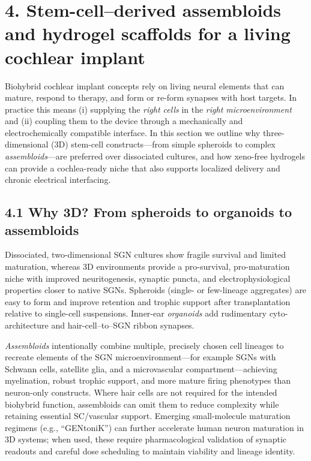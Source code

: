 \section*{4. Stem-cell–derived assembloids and hydrogel scaffolds for a living cochlear implant}

\noindent
Biohybrid cochlear implant concepts rely on living neural elements that can mature, respond to therapy, and form or re-form synapses with host targets. In practice this means (i) supplying the \emph{right cells} in the \emph{right microenvironment} and (ii) coupling them to the device through a mechanically and electrochemically compatible interface. In this section we outline why three-dimensional (3D) stem-cell constructs---from simple spheroids to complex \emph{assembloids}---are preferred over dissociated cultures, and how xeno-free hydrogels can provide a cochlea-ready niche that also supports localized delivery and chronic electrical interfacing.

\subsection*{4.1 Why 3D? From spheroids to organoids to assembloids}
Dissociated, two-dimensional SGN cultures show fragile survival and limited maturation, whereas 3D environments provide a pro-survival, pro-maturation niche with improved neuritogenesis, synaptic puncta, and electrophysiological properties closer to native SGNs.\citep{Zine2021StemCells,Sun2023CellProlif,Koehler2017NatBiotech} Spheroids (single- or few-lineage aggregates) are easy to form and improve retention and trophic support after transplantation relative to single-cell suspensions.\citep{Chang2020ActaBiomaterialia} Inner-ear \emph{organoids} add rudimentary cyto-architecture and hair-cell--to--SGN ribbon synapses.\citep{Koehler2013Nature,Koehler2017NatBiotech,Sun2023CellProlif} 

\emph{Assembloids} intentionally combine multiple, precisely chosen cell lineages to recreate elements of the SGN microenvironment---for example SGNs with Schwann cells, satellite glia, and a microvascular compartment---achieving myelination, robust trophic support, and more mature firing phenotypes than neuron-only constructs.\citep{Xia2023StemCellReports,Oliveira2023FrontiersPN} Where hair cells are not required for the intended biohybrid function, assembloids can omit them to reduce complexity while retaining essential SC/vascular support. Emerging small-molecule maturation regimens (e.g., “GENtoniK”) can further accelerate human neuron maturation in 3D systems; when used, these require pharmacological validation of synaptic readouts and careful dose scheduling to maintain viability and lineage identity.\citep{Hergenreder2024NatBiotech}

